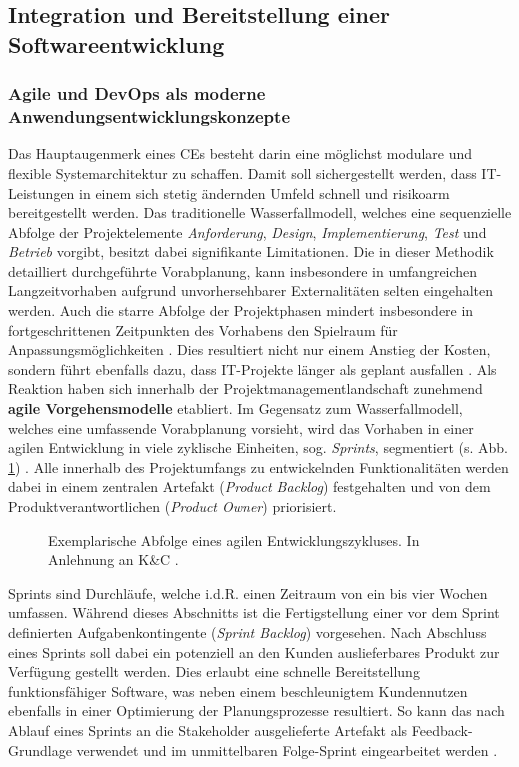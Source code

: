 \subsection{Integration und Bereitstellung einer Softwareentwicklung}
\subsubsection{Agile und DevOps als moderne Anwendungsentwicklungskonzepte}
Das Hauptaugenmerk eines CEs besteht darin eine möglichst modulare und flexible Systemarchitektur zu schaffen. Damit soll sichergestellt werden, dass IT-Leistungen in einem sich stetig ändernden Umfeld schnell und risikoarm bereitgestellt werden. Das traditionelle Wasserfallmodell, welches eine sequenzielle Abfolge der Projektelemente \textit{Anforderung}, \textit{Design}, \textit{Implementierung}, \textit{Test} und \textit{Betrieb} vorgibt, besitzt dabei signifikante Limitationen. Die in dieser Methodik detailliert durchgeführte Vorabplanung, kann insbesondere in umfangreichen Langzeitvorhaben aufgrund unvorhersehbarer Externalitäten selten eingehalten werden. Auch die starre Abfolge der Projektphasen mindert insbesondere in fortgeschrittenen Zeitpunkten des Vorhabens den Spielraum für Anpassungsmöglichkeiten \cite[5]{Vivenzio.2013}. Dies resultiert nicht nur einem Anstieg der Kosten, sondern führt ebenfalls dazu, dass IT-Projekte länger als geplant ausfallen \cite[41]{Vieweg.2015}. Als Reaktion haben sich innerhalb der Projektmanagementlandschaft zunehmend \textbf{agile Vorgehensmodelle} etabliert.
Im Gegensatz zum Wasserfallmodell, welches eine umfassende Vorabplanung vorsieht, wird das Vorhaben in einer agilen Entwicklung in viele zyklische Einheiten, sog. \textit{Sprints}, segmentiert (s. Abb. \ref*{fig:Agile_Cycle}) \cite[87]{Goll.2015}. Alle innerhalb des Projektumfangs zu entwickelnden Funktionalitäten werden dabei in einem zentralen Artefakt (\textit{Product Backlog}) festgehalten und von dem Produktverantwortlichen (\textit{Product Owner}) priorisiert. 
\begin{center}
	\begin{figure}[H]
		\centering
		\caption[Exemplarische Abfolge eines agilen Entwicklungszykluses]{Exemplarische Abfolge eines agilen Entwicklungszykluses. In Anlehnung an K\&C \cite{K&C.2021}.}
		\label{fig:Agile_Cycle}
	\end{figure}	
\end{center}
\vspace*{-15mm}
Sprints sind Durchläufe, welche i.d.R. einen Zeitraum von ein bis vier Wochen umfassen. Während dieses Abschnitts ist die Fertigstellung einer vor dem Sprint definierten Aufgabenkontingente (\textit{Sprint Backlog}) vorgesehen. Nach Abschluss eines Sprints soll dabei ein potenziell an den Kunden auslieferbares Produkt zur Verfügung gestellt werden. Dies erlaubt eine schnelle Bereitstellung funktionsfähiger Software, was neben einem beschleunigtem Kundennutzen ebenfalls in einer Optimierung der Planungsprozesse resultiert. So kann das nach Ablauf eines Sprints an die Stakeholder ausgelieferte Artefakt als Feedback-Grundlage verwendet und im unmittelbaren Folge-Sprint eingearbeitet werden \cite[39]{K&C.2021}.
